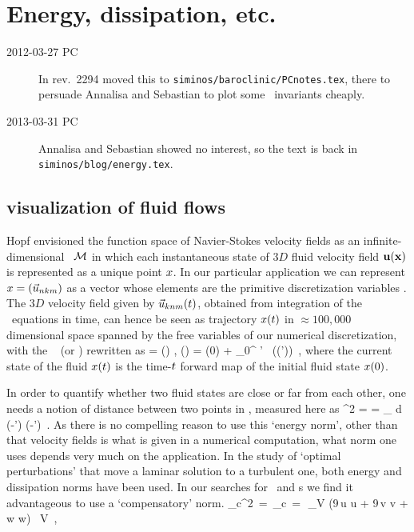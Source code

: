 \section{Energy, dissipation, etc.}
\begin{description}
\item[2012-03-27 PC] In rev.~2294 moved this to
\texttt{siminos/baroclinic/PCnotes.tex}, there to persuade Annalisa
and Sebastian to plot some \statesp\ invariants cheaply.

\item[2013-03-31 PC] Annalisa and Sebastian showed no interest, so
the text is back in \texttt{siminos/blog/energy.tex}.

\end{description}

\subsection{{\StateDsp} visualization of fluid flows}
\label{s:visualStatSp}

Hopf envisioned the function space of {Navier-Stokes} velocity fields as
an infinite-dimensional \statesp\ ${\cal M}$ in which each instantaneous state
of $3D$ fluid velocity field ${\bf u}({\bf x})$ is represented as a unique point
$x$. In our particular application we can represent $x =
(\vec{u}_{nkm})$ as a vector whose elements are the primitive
discretization variables . The $3D$ velocity field given
by $\vec{u}_{knm}(t)$, obtained from integration of the \NS\
equations in time, can hence be seen as trajectory $x(t)$ in
$\approx 100,000$ dimensional space spanned by the free variables of our
numerical discretization, with the \NSe\ \refeq{NSvorticEq}
(or \KSe)
rewritten as
\beq
   \dot{\ssp} = \vel(\ssp) ,
   \qquad
   \ssp(\zeit) = \ssp(0)
            + \int_0^\zeit \! \zeit' \, \vel(\ssp(\zeit'))
\,,
where the current state of the fluid $ x(t)$ is the time-$t$
forward map of the initial fluid state  $x(0)$.

In order to quantify whether two fluid states are close or far from each
other, one needs a notion of distance between two points in \statesp,
measured here as
\beq
  ^2  =  =
\int_\bCell \! d \bx \;
(-\vec{u}') \cdot (-')
\,.
As there is no compelling reason to use this {`energy norm'}, other than
that velocity fields is what is given in a numerical computation, what
norm one uses depends very much on the application. In the study of
`optimal perturbations' that move a laminar solution to a turbulent one,
both energy\rf{TeHaHe10} and dissipation\rf{LoCaCoPeGo11} norms
have been used.  In our searches for \reqva\ and \rpo s
we find it advantageous to use a `compensatory' norm.
\beq
   _c^2 \,=\, _c
   \,=\, \,\int_V (9\,u \cdot u + 9\,v \cdot v + w \cdot w)
        \, \mathrm{d}V
\,,

